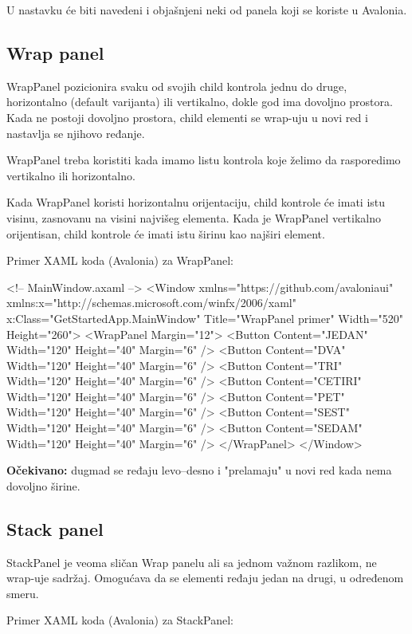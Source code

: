 \documentclass[11pt,a4paper]{article}
\begin{document}
U nastavku će biti navedeni i objašnjeni neki od panela koji se koriste u Avalonia.

\subsection{Wrap panel}
WrapPanel pozicionira svaku od svojih child kontrola jednu do druge, horizontalno (default varijanta) ili vertikalno, dokle god ima dovoljno prostora. Kada ne postoji dovoljno prostora, child elementi se wrap-uju u novi red i nastavlja se njihovo ređanje.

WrapPanel treba koristiti kada imamo listu kontrola koje želimo da rasporedimo vertikalno ili horizontalno.

Kada WrapPanel koristi horizontalnu orijentaciju, child kontrole će imati istu visinu, zasnovanu na visini najvišeg elementa. Kada je WrapPanel vertikalno orijentisan, child kontrole će imati istu širinu kao najširi element.

Primer XAML koda (Avalonia) za WrapPanel:

\begin{CodeBlock}
<!-- MainWindow.axaml -->
<Window xmlns="https://github.com/avaloniaui"
        xmlns:x="http://schemas.microsoft.com/winfx/2006/xaml"
        x:Class="GetStartedApp.MainWindow"
        Title="WrapPanel primer" Width="520" Height="260">
  <WrapPanel Margin="12">
    <Button Content="JEDAN" Width="120" Height="40" Margin="6" />
    <Button Content="DVA" Width="120" Height="40" Margin="6" />
    <Button Content="TRI" Width="120" Height="40" Margin="6" />
    <Button Content="CETIRI" Width="120" Height="40" Margin="6" />
    <Button Content="PET" Width="120" Height="40" Margin="6" />
    <Button Content="SEST" Width="120" Height="40" Margin="6" />
    <Button Content="SEDAM" Width="120" Height="40" Margin="6" />
  </WrapPanel>
</Window>
\end{CodeBlock}

\textbf{Očekivano:} dugmad se ređaju levo--desno i "prelamaju" u novi red kada nema dovoljno širine.

\subsection{Stack panel}
StackPanel je veoma sličan Wrap panelu ali sa jednom važnom razlikom, ne wrap-uje sadržaj. Omogućava da se elementi ređaju jedan na drugi, u određenom smeru.

Primer XAML koda (Avalonia) za StackPanel:
\end{document}
